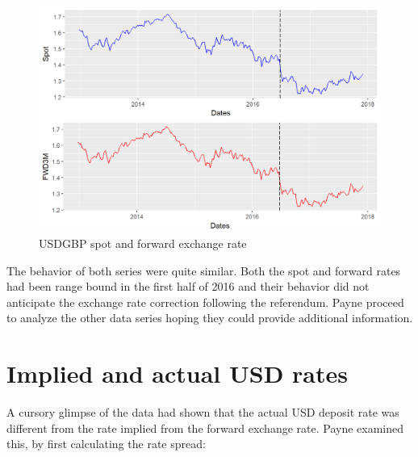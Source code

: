 \documentclass[]{book}
\newenvironment{Shaded}{\begin{snugshade}}{\end{snugshade}}
\newcommand{\KeywordTok}[1]{\textcolor[rgb]{0.13,0.29,0.53}{\textbf{#1}}}
\newcommand{\DataTypeTok}[1]{\textcolor[rgb]{0.13,0.29,0.53}{#1}}
\newcommand{\DecValTok}[1]{\textcolor[rgb]{0.00,0.00,0.81}{#1}}
\newcommand{\StringTok}[1]{\textcolor[rgb]{0.31,0.60,0.02}{#1}}
\newcommand{\OperatorTok}[1]{\textcolor[rgb]{0.81,0.36,0.00}{\textbf{#1}}}
\newcommand{\NormalTok}[1]{#1}
\theoremstyle{definition}
\theoremstyle{definition}
\theoremstyle{definition}
\theoremstyle{remark}
\begin{document}
\begin{figure}
\includegraphics[width=1\linewidth]{images/unnamed-chunk-8-1} \caption{USDGBP spot and forward exchange rate}\label{fig:unnamed-chunk-8}
\end{figure}

The behavior of both series were quite similar. Both the spot and
forward rates had been range bound in the first half of 2016 and their
behavior did not anticipate the exchange rate correction following the
referendum. Payne proceed to analyze the other data series hoping they
could provide additional information.

\section{Implied and actual USD
rates}\label{implied-and-actual-usd-rates}

A cursory glimpse of the data had shown that the actual USD deposit rate
was different from the rate implied from the forward exchange rate.
Payne examined this, by first calculating the rate spread:

\begin{Shaded}
\end{Shaded}
\end{document}
